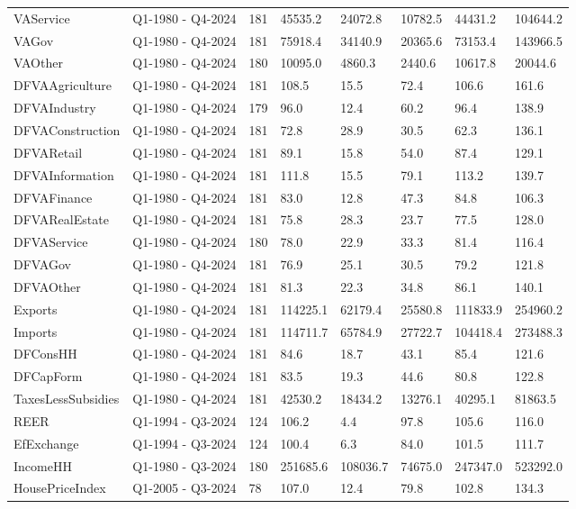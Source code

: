\begin{longtable}[t]{llllllll}
VAService & Q1-1980 - Q4-2024 & 181 & 45535.2 & 24072.8 & 10782.5 & 44431.2 & 104644.2\\
VAGov & Q1-1980 - Q4-2024 & 181 & 75918.4 & 34140.9 & 20365.6 & 73153.4 & 143966.5\\
\addlinespace
VAOther & Q1-1980 - Q4-2024 & 180 & 10095.0 & 4860.3 & 2440.6 & 10617.8 & 20044.6\\
DFVAAgriculture & Q1-1980 - Q4-2024 & 181 & 108.5 & 15.5 & 72.4 & 106.6 & 161.6\\
DFVAIndustry & Q1-1980 - Q4-2024 & 179 & 96.0 & 12.4 & 60.2 & 96.4 & 138.9\\
DFVAConstruction & Q1-1980 - Q4-2024 & 181 & 72.8 & 28.9 & 30.5 & 62.3 & 136.1\\
DFVARetail & Q1-1980 - Q4-2024 & 181 & 89.1 & 15.8 & 54.0 & 87.4 & 129.1\\
\addlinespace
DFVAInformation & Q1-1980 - Q4-2024 & 181 & 111.8 & 15.5 & 79.1 & 113.2 & 139.7\\
DFVAFinance & Q1-1980 - Q4-2024 & 181 & 83.0 & 12.8 & 47.3 & 84.8 & 106.3\\
DFVARealEstate & Q1-1980 - Q4-2024 & 181 & 75.8 & 28.3 & 23.7 & 77.5 & 128.0\\
DFVAService & Q1-1980 - Q4-2024 & 180 & 78.0 & 22.9 & 33.3 & 81.4 & 116.4\\
DFVAGov & Q1-1980 - Q4-2024 & 181 & 76.9 & 25.1 & 30.5 & 79.2 & 121.8\\
\addlinespace
DFVAOther & Q1-1980 - Q4-2024 & 181 & 81.3 & 22.3 & 34.8 & 86.1 & 140.1\\
Exports & Q1-1980 - Q4-2024 & 181 & 114225.1 & 62179.4 & 25580.8 & 111833.9 & 254960.2\\
Imports & Q1-1980 - Q4-2024 & 181 & 114711.7 & 65784.9 & 27722.7 & 104418.4 & 273488.3\\
DFConsHH & Q1-1980 - Q4-2024 & 181 & 84.6 & 18.7 & 43.1 & 85.4 & 121.6\\
DFCapForm & Q1-1980 - Q4-2024 & 181 & 83.5 & 19.3 & 44.6 & 80.8 & 122.8\\
\addlinespace
TaxesLessSubsidies & Q1-1980 - Q4-2024 & 181 & 42530.2 & 18434.2 & 13276.1 & 40295.1 & 81863.5\\
REER & Q1-1994 - Q3-2024 & 124 & 106.2 & 4.4 & 97.8 & 105.6 & 116.0\\
EfExchange & Q1-1994 - Q3-2024 & 124 & 100.4 & 6.3 & 84.0 & 101.5 & 111.7\\
IncomeHH & Q1-1980 - Q3-2024 & 180 & 251685.6 & 108036.7 & 74675.0 & 247347.0 & 523292.0\\
HousePriceIndex & Q1-2005 - Q3-2024 & 78 & 107.0 & 12.4 & 79.8 & 102.8 & 134.3\\

\end{longtable}
